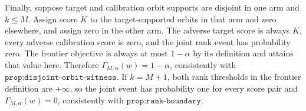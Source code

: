 Finally, suppose target and calibration orbit supports are disjoint in one arm and \(k\le M\). Assign score \(K\) to the target-supported orbits in that arm and zero elsewhere, and assign zero in the other arm. The adverse target score is always \(K\), every adverse calibration score is zero, and the joint rank event has probability zero. The frontier objective is always at most \(1-\alpha\) by its definition and attains that value here. Therefore \(\Gamma_{M,\alpha}(w)=1-\alpha\), consistently with \(\texttt{prop:disjoint-orbit-witness}\). If \(k=M+1\), both rank thresholds in the frontier definition are \(+\infty\), so the joint event has probability one for every score pair and \(\Gamma_{M,\alpha}(w)=0\), consistently with \(\texttt{prop:rank-boundary}\).